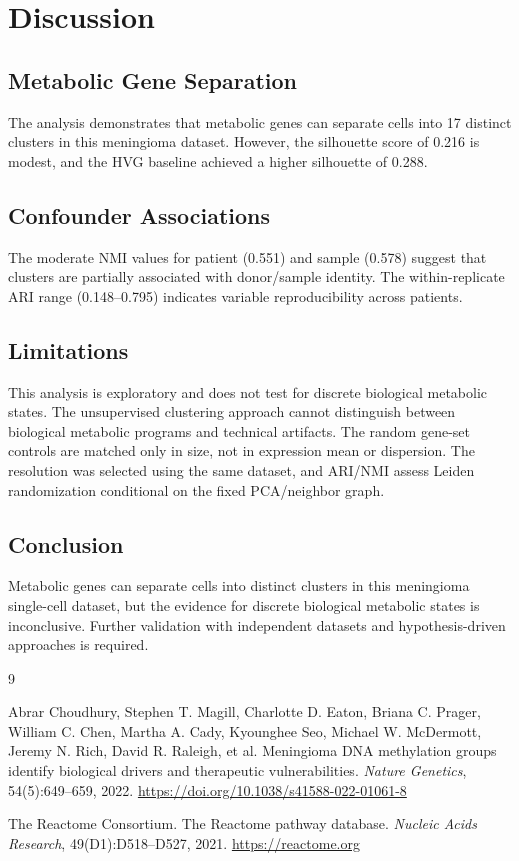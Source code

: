 \documentclass[11pt,a4paper]{article}
\begin{document}
\section{Discussion}

\subsection{Metabolic Gene Separation}
The analysis demonstrates that metabolic genes can separate cells into 17 distinct clusters in this meningioma dataset. However, the silhouette score of 0.216 is modest, and the HVG baseline achieved a higher silhouette of 0.288.

\subsection{Confounder Associations}
The moderate NMI values for patient (0.551) and sample (0.578) suggest that clusters are partially associated with donor/sample identity. The within-replicate ARI range (0.148--0.795) indicates variable reproducibility across patients.

\subsection{Limitations}
This analysis is exploratory and does not test for discrete biological metabolic states. The unsupervised clustering approach cannot distinguish between biological metabolic programs and technical artifacts. The random gene-set controls are matched only in size, not in expression mean or dispersion. The resolution was selected using the same dataset, and ARI/NMI assess Leiden randomization conditional on the fixed PCA/neighbor graph.

\subsection{Conclusion}
Metabolic genes can separate cells into distinct clusters in this meningioma single-cell dataset, but the evidence for discrete biological metabolic states is inconclusive. Further validation with independent datasets and hypothesis-driven approaches is required.

\begin{thebibliography}{9}

Abrar Choudhury, Stephen T. Magill, Charlotte D. Eaton, Briana C. Prager, William C. Chen, Martha A. Cady, Kyounghee Seo, Michael W. McDermott, Jeremy N. Rich, David R. Raleigh, et al.
\newblock Meningioma DNA methylation groups identify biological drivers and therapeutic vulnerabilities.
\newblock \textit{Nature Genetics}, 54(5):649--659, 2022.
\newblock \url{https://doi.org/10.1038/s41588-022-01061-8}

The Reactome Consortium.
\newblock The Reactome pathway database.
\newblock \textit{Nucleic Acids Research}, 49(D1):D518--D527, 2021.
\newblock \url{https://reactome.org}

\end{thebibliography}
\end{document}
